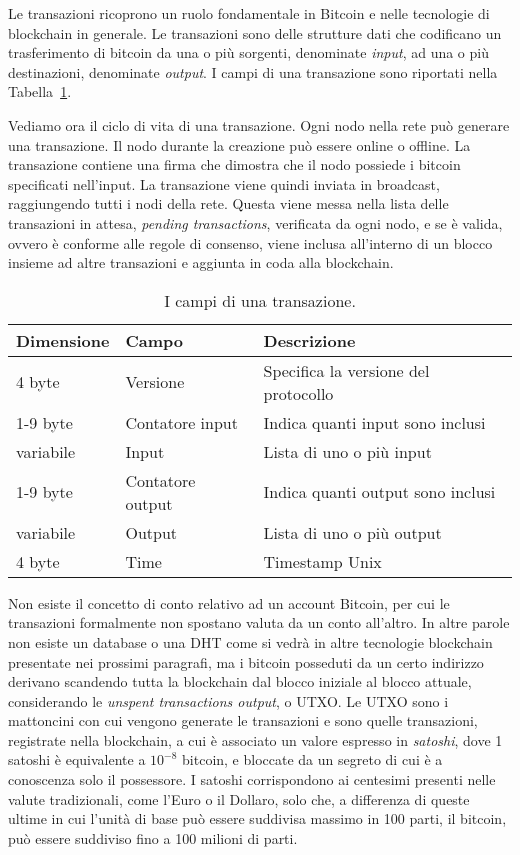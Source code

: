 Le transazioni ricoprono un ruolo fondamentale in Bitcoin e nelle tecnologie di blockchain in generale. Le transazioni sono delle strutture dati che codificano un trasferimento di bitcoin da una o più sorgenti, denominate \emph{input}, ad una o più destinazioni, denominate \emph{output}. I campi di una transazione sono riportati nella Tabella~\ref{tab:tx_fields}.

Vediamo ora il ciclo di vita di una transazione. Ogni nodo nella rete può generare una transazione. Il nodo durante la creazione può essere online o offline. La transazione contiene una firma che dimostra che il nodo possiede i bitcoin specificati nell'input. La transazione viene quindi inviata in broadcast, raggiungendo tutti i nodi della rete. Questa viene messa nella lista delle transazioni in attesa, \emph{pending transactions}, verificata da ogni nodo, e se è valida, ovvero è conforme alle regole di consenso, viene inclusa all'interno di un blocco insieme ad altre transazioni e aggiunta in coda alla blockchain.

\begin{table}
	\centering
	\begin{tabular}{lll}
		\toprule
		Dimensione&Campo&Descrizione\\
		\midrule
		4 byte&Versione&Specifica la versione del protocollo\\
		1-9 byte&Contatore input&Indica quanti input sono inclusi\\
		variabile&Input&Lista di uno o più input\\
		1-9 byte&Contatore output&Indica quanti output sono inclusi\\
		variabile&Output&Lista di uno o più output\\
		4 byte&Time&Timestamp Unix\\
		\bottomrule
	\end{tabular}
	\caption{I campi di una transazione.}
	\label{tab:tx_fields}
\end{table}

Non esiste il concetto di conto relativo ad un account Bitcoin, per cui le transazioni formalmente non spostano valuta da un conto all'altro. In altre parole non esiste un database o una DHT come si vedrà in altre tecnologie blockchain presentate nei prossimi paragrafi, ma i bitcoin posseduti da un certo indirizzo derivano scandendo tutta la blockchain dal blocco iniziale al blocco attuale, considerando le \emph{unspent transactions output}, o UTXO. Le UTXO sono i mattoncini con cui vengono generate le transazioni e sono quelle transazioni, registrate nella blockchain, a cui è associato un valore espresso in \emph{satoshi}, dove 1 satoshi è equivalente a $10^{-8}$ bitcoin, e bloccate da un segreto di cui è a conoscenza solo il possessore. I satoshi corrispondono ai centesimi presenti nelle valute tradizionali, come l'Euro o il Dollaro, solo che, a differenza di queste ultime in cui l'unità di base può essere suddivisa massimo in 100 parti, il bitcoin, può essere suddiviso fino a 100 milioni di parti.

